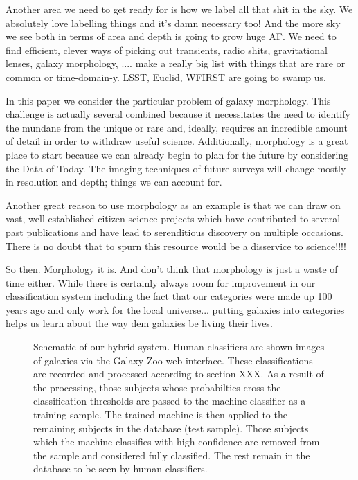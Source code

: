 \documentclass[twocolumn]{aastex6}
\begin{document}
Another area we need to get ready for is how we label all that shit in the sky. 
We absolutely love labelling things and it's damn necessary too! And the more sky
we see both in terms of area and depth is going to grow huge AF. We need to find 
efficient, clever ways of picking out transients, radio shits, gravitational lenses, 
galaxy morphology, .... make a really big list with things that are rare or common
or time-domain-y. LSST, Euclid, WFIRST are going to swamp us. 

In this paper we consider the particular problem of galaxy morphology. This 
challenge is actually several combined because it necessitates the need to 
identify the mundane from the unique or rare and, ideally, requires an incredible
amount of detail in order to withdraw useful science. Additionally, morphology is
a great place to start because we can already begin to plan for the future by 
considering the Data of Today. The imaging techniques of future surveys will 
change mostly in resolution and depth; things we can account for. 

Another great reason to use morphology as an example is that we can draw on 
vast, well-established citizen science projects which have contributed to several 
past publications and have lead to serenditious discovery on multiple occasions. 
There is no doubt that to spurn this resource would be a disservice to science!!!!

So then. Morphology it is. And don't think that morphology is just a waste of time
either. While there is certainly always room for improvement in our classification 
system including the fact that our categories were made up 100 years ago and only 
work for the local universe... putting galaxies into categories helps us learn 
about the way dem galaxies be living their lives. 

\begin{figure}[ht!]
\caption{Schematic of our hybrid system. Human classifiers are shown images of galaxies via the Galaxy Zoo web interface. These  classifications are recorded and processed according to section XXX. As a result of the processing, those subjects whose probabilties cross the classification thresholds are passed to the machine classifier as a training sample. The trained machine is then applied to the remaining subjects in the database (test sample). Those subjects which the machine classifies with high confidence are removed from the sample and considered fully classified. The rest remain in the database to be seen by human classifiers. \label{fig: schematic}}
\end{figure}
\end{document}
